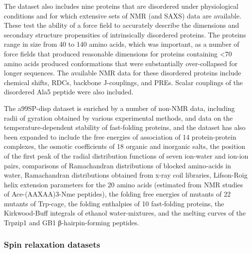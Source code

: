 \documentclass[9pt,review]{livecoms}
\begin{document}
The dataset also includes nine proteins that are disordered under physiological conditions and for which extensive sets of NMR (and SAXS) data are available.
These test the ability of a force field to accurately describe the dimensions and secondary structure propensities of intrinsically disordered proteins.
The proteins range in size from 40 to 140 amino acids, which was important, as a number of force fields that produced reasonable dimensions for proteins containing <70 amino acids produced conformations that were substantially over-collapsed for longer sequences.
The available NMR data for these disordered proteins include chemical shifts, RDCs, backbone J-couplings, and PREs.
Scalar couplings of the disordered Ala5 peptide were also included. 

The a99SP-disp dataset is enriched by a number of non-NMR data, including radii of gyration obtained by various experimental methods, and data on the temperature-dependent stability of fast-folding proteins, and the dataset has also been expanded \cite{piana_development_2020} to include the free energies of association of 14 protein-protein complexes, the osmotic coefficients of 18 organic and inorganic salts, the position of the first peak of the radial distribution functions of seven ion-water and ion-ion pairs, comparisons of Ramachandran distributions of blocked amino-acids in water, Ramachandran distributions obtained from x-ray coil libraries, Lifson-Roig helix extension parameters for the 20 amino acids (estimated from NMR studies of Ace-(AAXAA)3-Nme peptides), the folding free energies of mutants of 22 mutants of Trp-cage, the folding enthalpies of 10 fast-folding proteins, the Kirkwood-Buff integrals of ethanol water-mixtures, and the melting curves of the Trpzip1 and GB1 β-hairpin-forming peptides.

\subsubsection{Spin relaxation datasets}
\label{sub2:spin_relax_datasets}
\end{document}
